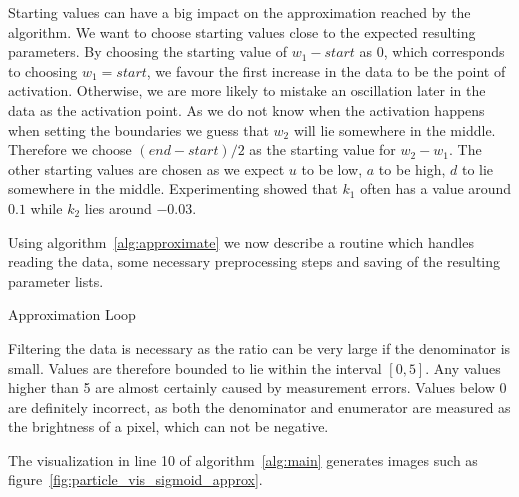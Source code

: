 Starting values can have a big impact on the approximation reached by the algorithm. We want to choose starting values close to the expected resulting parameters. By choosing the starting value of $w_1 - start$ as $0$, which corresponds to choosing $w_1 = start$, we favour the first increase in the data to be the point of activation. Otherwise, we are more likely to mistake an oscillation later in the data as the activation point. As we do not know when the activation happens when setting the boundaries we guess that $w_2$ will lie somewhere in the middle. Therefore we choose $(end - start)/2$ as the starting value for $w_2 - w_1$. The other starting values are chosen as we expect $u$ to be low, $a$ to be high, $d$ to lie somewhere in the middle. Experimenting showed that $k_1$ often has a value around $0.1$ while $k_2$ lies around $-0.03$.

Using algorithm~\ref{alg:approximate} we now describe a routine which handles reading the data, some necessary preprocessing steps and saving of the resulting parameter lists.

\begin{algorithm}[H] \label{alg:main}
	\SetAlgoLined
	\DontPrintSemicolon
	\LinesNumbered
	\caption{Approximation Loop}
	
	
	\BlankLine
\end{algorithm}
\vspace{1cm}

Filtering the data is necessary as the ratio can be very large if the denominator is small. Values are therefore bounded to lie within the interval $[0, 5]$. Any values higher than 5 are almost certainly caused by measurement errors. Values below 0 are definitely incorrect, as both the denominator and enumerator are measured as the brightness of a pixel, which can not be negative.

The visualization in line 10 of algorithm~\ref{alg:main} generates images such as figure~\ref{fig:particle_vis_sigmoid_approx}.

